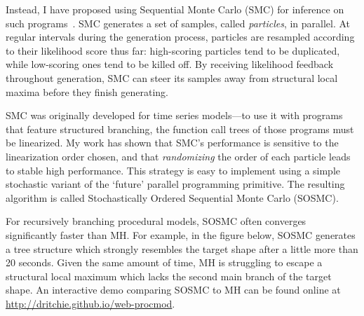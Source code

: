 \documentclass[
10pt, %
a4paper, %
oneside, %
headinclude,footinclude, %
BCOR5mm, %
]{scrartcl}
\begin{document}
Instead, I have proposed using Sequential Monte Carlo (SMC) for inference on such programs~\cite{SOSMC}. SMC generates a set of samples, called \emph{particles}, in parallel. At regular intervals during the generation process, particles are resampled according to their likelihood score thus far: high-scoring particles tend to be duplicated, while low-scoring ones tend to be killed off. By receiving likelihood feedback throughout generation, SMC can steer its samples away from structural local maxima before they finish generating.

SMC was originally developed for time series models---to use it with programs that feature structured branching, the function call trees of those programs must be linearized. My work has shown that SMC's performance is sensitive to the linearization order chosen, and that \emph{randomizing} the order of each particle leads to stable high performance. This strategy is easy to implement using a simple stochastic variant of the `future' parallel programming primitive. The resulting algorithm is called Stochastically Ordered Sequential Monte Carlo (SOSMC).

For recursively branching procedural models, SOSMC often converges significantly faster than MH. For example, in the figure below, SOSMC generates a tree structure which strongly resembles the target shape after a little more than 20 seconds. Given the same amount of time, MH is struggling to escape a structural local maximum which lacks the second main branch of the target shape. An interactive demo comparing SOSMC to MH can be found online at \url{http://dritchie.github.io/web-procmod}.
\end{document}

